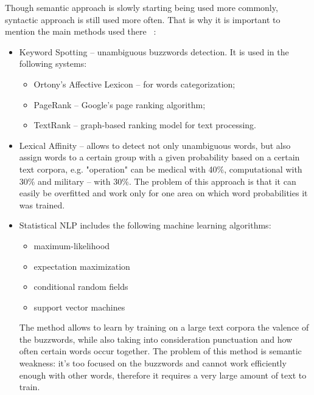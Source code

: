 \documentclass[11pt]{report}
\numberwithin{equation}{section} %
\begin{document}
Though semantic approach is slowly starting being used more commonly, syntactic approach is still used more often. That is why it is important to mention the main methods used there ~\cite{Cambria}:

\begin{itemize}
\item Keyword Spotting -- unambiguous buzzwords detection. It is used in the following systems:
\begin{itemize}
\item Ortony's Affective Lexicon -- for words categorization;
\item PageRank -- Google's page ranking algorithm;
\item TextRank -- graph-based ranking model for text processing.
\end{itemize}  
\item Lexical Affinity -- allows to detect not only unambiguous words, but also assign words to a certain group with a given probability based on a certain text corpora, e.g. "operation" can be medical with 40\%, computational with 30\% and military -- with 30\%. The problem of this approach is that it can easily be overfitted and work only for one area on which word probabilities it was trained.
\item Statistical NLP includes the following machine learning algorithms:
\begin{itemize}
\item maximum-likelihood
\item expectation maximization
\item conditional random fields
\item support vector machines 
\end{itemize}
The method allows to learn by training on a large text corpora the valence of the buzzwords, while also taking into consideration punctuation and how often certain words occur together. The problem of this method is semantic weakness: it's too focused on the buzzwords and cannot work efficiently enough with other words, therefore it requires a very large amount of text to train.
\end{itemize}
\end{document}
